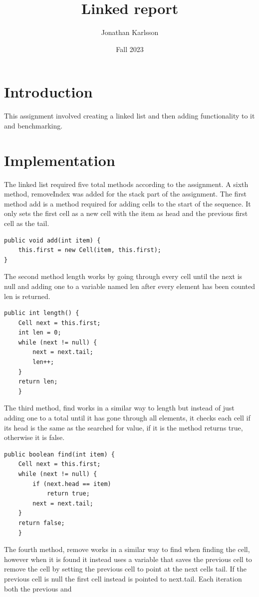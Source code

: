 \documentclass[a4paper,11pt]{article}
\begin{document}
\title{
    \textbf{Linked report}
}
\author{Jonathan Karlsson}
\date{Fall 2023}

\maketitle

\section*{Introduction}
This assignment involved creating a linked list and then adding functionality to it and benchmarking.


\section*{Implementation}
The linked list required five total methods according to the assignment. A sixth method, removeIndex was added for the stack part of the assignment.
The first method add is a method required for adding cells to the start of the sequence. It only sets the first cell as a new cell with the item as head and 
the previous first cell as the tail. 
\begin{verbatim}
public void add(int item) {
    this.first = new Cell(item, this.first);
}
\end{verbatim}
The second method length works by going through every cell until the next is null and adding one to a variable named len
after every element has been counted len is returned.
\begin{verbatim}
public int length() {
    Cell next = this.first;
    int len = 0;
    while (next != null) {
        next = next.tail;
        len++;
    }
    return len;
    }
\end{verbatim}
The third method, find works in a similar way to length but instead of just adding one to a total until it has gone through all elements, 
it checks each cell if its head is the same as the searched for value, if it is the method returns true, otherwise it is false.
\begin{verbatim}
public boolean find(int item) {
    Cell next = this.first;
    while (next != null) {
        if (next.head == item)
            return true;
        next = next.tail;   
    }
    return false;
    }
\end{verbatim}
The fourth method, remove works in a similar way to find when finding the cell, however when it is found it instead uses a variable that saves the previous cell to remove the 
cell by setting the previous cell to point at the next cells tail. If the previous cell is null the first cell instead is pointed to next.tail. Each iteration both the previous and 
\end{document}
